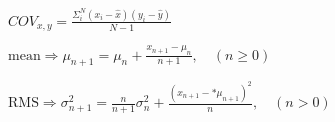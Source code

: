 \documentclass{article}
\begin{document}
$ COV_{x,y} = \frac{\Sigma_i^N (x_i - \hat{x})(y_i - \hat{y})}{N-1}$
\pagebreak

$\text{mean}\Rightarrow \mu_{n+1} = \mu_n + \displaystyle\frac{x_{n+1} - \mu_n}{n + 1},\quad(n\geq0)$
\pagebreak

$\text{RMS}\Rightarrow\sigma^2_{n+1} = \displaystyle\frac{n}{n + 1}\sigma^2_n + \displaystyle\frac{(x_{n+1} - *\mu_{n+1})^2}{n},\quad(n>0)$
\pagebreak
\end{document}
